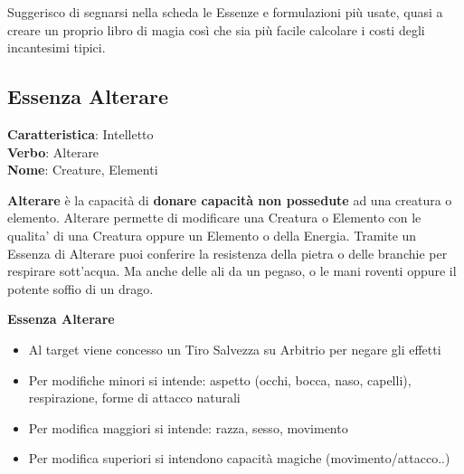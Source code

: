 \documentclass[a4paper,11pt,twoside,openany]{book}
\begin{document}
\bigskip

Suggerisco di segnarsi nella scheda le Essenze e formulazioni più usate, quasi a creare un proprio libro di magia così che sia più facile calcolare i costi degli incantesimi tipici.

\pagebreak

\subsection{Essenza Alterare}

\textbf{Caratteristica}: Intelletto\\
\textbf{Verbo}: Alterare\\
\textbf{Nome}: Creature, Elementi\\

\label{essenza-alterare---intelletto}

\textbf{Alterare} è la capacità di \textbf{donare capacità non possedute} ad una creatura o elemento.
Alterare permette di modificare una Creatura o Elemento con le qualita' di una Creatura oppure un Elemento o della Energia.
Tramite un Essenza di Alterare puoi conferire la resistenza della pietra o delle branchie per   respirare sott'acqua.
Ma anche delle ali da un pegaso, o le mani roventi oppure il potente soffio di un drago.

\bigskip

\textbf{Essenza Alterare}
\begin{itemize}
	\item
	      Al target viene concesso un Tiro Salvezza su Arbitrio per negare gli effetti
	\item
	      Per modifiche minori si intende: aspetto (occhi, bocca, naso, capelli), respirazione, forme di attacco naturali
	\item
	      Per modifica maggiori si intende: razza, sesso, movimento
	\item
	      Per modifica superiori si intendono capacità magiche (movimento/attacco..)
\end{itemize}

\bigskip
\end{document}

